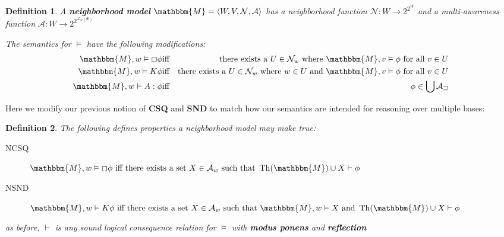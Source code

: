\documentclass{article}
\newcommand{\tmop}[1]{\ensuremath{\operatorname{#1}}}
\newcommand{\tmstrong}[1]{\textbf{#1}}
\newcommand{\tmtextbf}[1]{{\bfseries{#1}}}
\newenvironment{descriptiondash}{\begin{description} }{\end{description}}
\newtheorem{definition}{Definition}
\begin{document}
\begin{definition}
  \label{neighborhoodmodels}A {\tmstrong{neighborhood model}} $\mathbbm{M}=
  \langle W, V, \mathcal{N}, \mathcal{A} \rangle$ has a neighborhood function
  $\mathcal{N} : W \rightarrow 2^{2^W}$ and a multi-awareness function
  $\mathcal{A} : W \rightarrow 2^{2^{\mathcal{L}_N (\Phi)}}$
  
  
  
  The semantics for $\vDash$ have the following modifications:
  \begin{eqnarray*}
    \mathbbm{M}, w \vDash \Box \phi & \text{iff} & \text{there exists a $U \in
    \mathcal{N}_w$ where $\mathbbm{M}, v \vDash \phi$ for all $v \in U$}\\
    \mathbbm{M}, w \vDash K \phi & \text{iff} & \text{there exists a $U \in
    \mathcal{N}_w$ where $w \in U$ and $\mathbbm{M}, v \vDash \phi$ for all $v
    \in U$}\\
    \mathbbm{M}, w \vDash A : \phi & \text{iff} & \phi \in \bigcup
    \mathcal{A_w}
  \end{eqnarray*}
\end{definition}

Here we modify our previous notion of \tmtextbf{CSQ} and \tmtextbf{SND} to
match how our semantics are intended for reasoning over multiple bases:

\begin{definition}
  The following defines properties a neighborhood model may make true:
  
  \begin{descriptiondash}
    \item[NCSQ] $\mathbbm{M}, w \vDash \Box \phi \text{ iff there exists a set
    $X \in \mathcal{A}_w$ such that } \tmop{Th} (\mathbbm{M}) \cup X \vdash
    \phi$
    
    \item[NSND] $\mathbbm{M}, w \vDash K \phi \text{ iff there exists a set $X
    \in \mathcal{A}_w$ such that $\mathbbm{M}, w \vDash X$ and } \tmop{Th}
    (\mathbbm{M}) \cup X \vdash \phi$
  \end{descriptiondash}
  
  as before, $\vdash$ is any sound logical consequence relation for $\vDash$
  with \tmtextbf{modus ponens} and \tmtextbf{reflection}
\end{definition}
\end{document}
